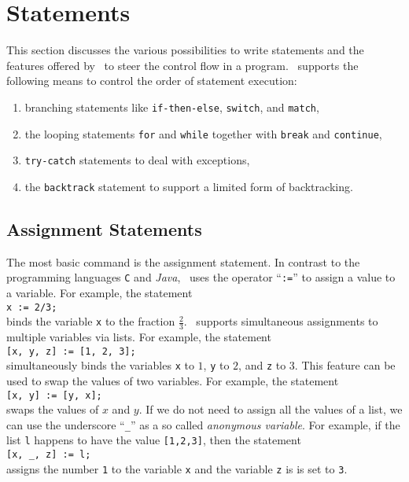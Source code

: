 \chapter{Statements}
This section discusses the various possibilities to write statements and the 
features offered by \setlx\ to steer the control flow in a program.
\setlx\ supports the following means to control the order of statement execution:
\begin{enumerate}
\item branching statements like \texttt{if-then-else}, \texttt{switch}, and \texttt{match},
\item the looping statements \texttt{for} and \texttt{while} together with \texttt{break} and
      \texttt{continue}, 
\item \texttt{try-catch} statements to deal with exceptions,
\item the \texttt{backtrack} statement to support a limited form of backtracking.
\end{enumerate}

\section{Assignment Statements}
The most basic command is the assignment statement.  In contrast to the programming languages \texttt{C}
and \textsl{Java}, \setlx\ uses the operator ``\texttt{:=}'' to assign a value to a variable.  For example, the statement
\\[0.2cm]
\hspace*{1.3cm}
\texttt{x := 2/3;}
\\[0.2cm]
binds the variable \texttt{x} to the fraction $\frac{2}{3}$.  \setlx\ supports simultaneous
assignments to multiple variables via lists.  For example, the statement
\\[0.2cm]
\hspace*{1.3cm}
\texttt{[x, y, z] := [1, 2, 3];}
\\[0.2cm]
simultaneously binds the variables \texttt{x} to $1$, \texttt{y} to $2$, and \texttt{z} to $3$.
This feature can be used to swap the values of two variables. For example,  the statement
\\[0.2cm]
\hspace*{1.3cm}
\texttt{[x, y] := [y, x];}
\\[0.2cm]
swaps the values of $x$ and $y$.  If we do not need to assign all the values of a list, we
can use the underscore ``\texttt{\_}'' as a so called \emph{anonymous variable}.  For example, if
the list \texttt{l} happens to have the value \texttt{[1,2,3]}, then the statement
\\[0.2cm]
\hspace*{1.3cm}
\texttt{[x, \_, z] := l;} 
\\[0.2cm]
assigns the number \texttt{1} to the variable \texttt{x} and the variable \texttt{z} is
is set to \texttt{3}.

